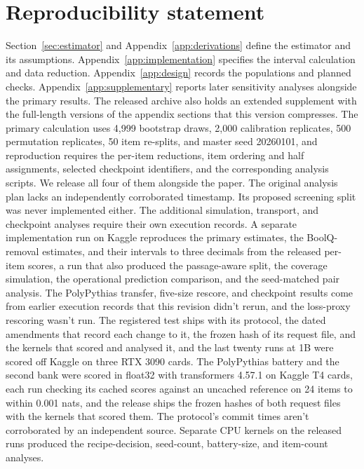 \section*{Reproducibility statement}
Section~\ref{sec:estimator} and Appendix~\ref{app:derivations} define the estimator and its assumptions. Appendix~\ref{app:implementation} specifies the interval calculation and data reduction. Appendix~\ref{app:design} records the populations and planned checks. Appendix~\ref{app:supplementary} reports later sensitivity analyses alongside the primary results. The released archive also holds an extended supplement with the full-length versions of the appendix sections that this version compresses. The primary calculation uses 4,999 bootstrap draws, 2,000 calibration replicates, 500 permutation replicates, 50 item re-splits, and master seed 20260101, and reproduction requires the per-item reductions, item ordering and half assignments, selected checkpoint identifiers, and the corresponding analysis scripts. We release all four of them alongside the paper. The original analysis plan lacks an independently corroborated timestamp. Its proposed screening split was never implemented either. The additional simulation, transport, and checkpoint analyses require their own execution records. A separate implementation run on Kaggle reproduces the primary estimates, the BoolQ-removal estimates, and their intervals to three decimals from the released per-item scores, a run that also produced the passage-aware split, the coverage simulation, the operational prediction comparison, and the seed-matched pair analysis. The PolyPythias transfer, five-size rescore, and checkpoint results come from earlier execution records that this revision didn't rerun, and the loss-proxy rescoring wasn't run. The registered test ships with its protocol, the dated amendments that record each change to it, the frozen hash of its request file, and the kernels that scored and analysed it, and the last twenty runs at 1B were scored off Kaggle on three RTX 3090 cards. The PolyPythias battery and the second bank were scored in float32 with transformers 4.57.1 on Kaggle T4 cards, each run checking its cached scores against an uncached reference on 24 items to within 0.001 nats, and the release ships the frozen hashes of both request files with the kernels that scored them. The protocol's commit times aren't corroborated by an independent source. Separate CPU kernels on the released runs produced the recipe-decision, seed-count, battery-size, and item-count analyses.

